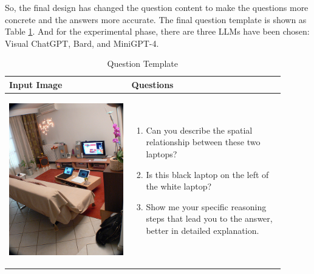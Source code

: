 \documentclass[twocolumn,11pt]{report}
\begin{document}
So, the final design has changed the question content to make the questions more concrete and the answers more accurate. The final question template is shown as Table \ref{tab:question_template}. And for the experimental phase, there are three LLMs have been chosen: Visual ChatGPT\cite{wu2023visual}, Bard, and MiniGPT-4\cite{zhu2023minigpt4}. 

\begin{table}[ht]
    \centering
    \caption{Question Template}
    \label{tab:question_template}
    \begin{tabular}{|p{0.4\linewidth}|p{0.5\linewidth}|}
        \hline
        \textbf{Input Image} &\textbf{Questions}\\
        \hline
        \begin{center} \includegraphics[width=\linewidth]{../image set/hard/000000104739.jpg} \end{center}
        & \begin{enumerate}
            \item Can you describe the spatial relationship between these two laptops?
            \item Is this black laptop on the left of the white laptop?
            \item Show me your specific reasoning steps that lead you to the answer, better in detailed explanation.
        \end{enumerate}\\
        \hline
        \end{tabular}
\end{table}
\end{document}
